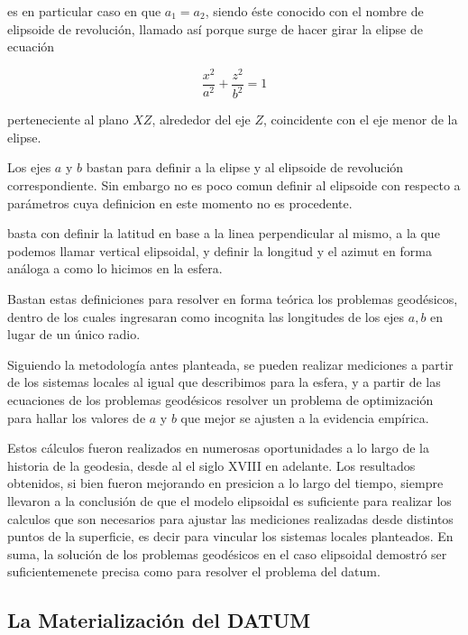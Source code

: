 \documentclass{tufte-book}
\begin{document}
 es en particular caso en que \(a_1=a_2\),
siendo éste conocido con el nombre de elipsoide de revolución, llamado así porque
surge de hacer girar la elipse de ecuación

\begin{equation*}
{\frac{x^{{2}}}{a^{{2}}}+\frac{z^{{2}}}{b^{{2}}}=1}
\end{equation*}

perteneciente al plano \(XZ\), alrededor del eje \(Z\), coincidente con el eje menor
de la elipse. 
 
Los ejes \(a\) y \(b\) bastan para definir a la elipse y al elipsoide de revolución
correspondiente. Sin embargo no es poco comun definir al elipsoide con respecto a
parámetros cuya definicion en este momento no es procedente.

 basta con definir la latitud en base a la
linea perpendicular al mismo, a la que podemos llamar vertical elipsoidal, y definir la
longitud y el azimut en forma análoga a como lo hicimos en la esfera.

Bastan estas definiciones para resolver en forma teórica los problemas geodésicos,
dentro de los cuales ingresaran como incognita las longitudes de los ejes \(a,b\) en
lugar de un único radio.

Siguiendo la metodología antes planteada, se pueden realizar mediciones a partir de
los sistemas locales al igual que describimos para la esfera, y a partir de las ecuaciones
de los problemas geodésicos resolver un problema de optimización para hallar los valores
de \(a\) y \(b\) que mejor se ajusten a la evidencia empírica.

Estos cálculos fueron realizados en numerosas oportunidades a lo largo de la historia
de la geodesia, desde al el siglo XVIII en adelante. Los resultados obtenidos, si bien
fueron mejorando en presicion a lo largo del tiempo, siempre llevaron a la conclusión
de que el modelo elipsoidal es suficiente para realizar los calculos que son necesarios
para ajustar las mediciones realizadas desde distintos puntos de la superficie, es decir
para vincular los sistemas locales planteados. En suma, la solución de los problemas
geodésicos en el caso elipsoidal demostró ser suficientemenete precisa como para
resolver el problema del datum.

\subsection{La Materialización del DATUM}
\end{document}
